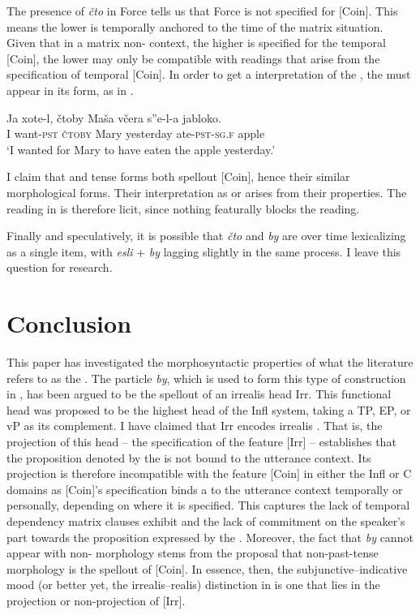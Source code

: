 \documentclass[output=paper,modfonts,newtxmath,hidelinks,]{langscibook}
\begin{document}
\noindent The presence of \textit{čto} in Force tells us that Force is not specified for [Coin]. This means the lower  is temporally anchored to the time of the matrix situation. Given that in a matrix non- context, the higher  is specified for the temporal [Coin], the lower  may only be compatible with readings that arise from the specification of temporal [Coin]. In order to get a  interpretation of the  , the  must appear in its  form, as in .

\ea \label{10:ex34}
\gll Ja xote-l, čtoby Maša včera s”e-l-a jabloko.\\
     I want\textsc{-pst} \textsc{čtoby} Mary yesterday ate\textsc{-pst-sg.f} apple \\
\glt `I wanted for Mary to have eaten the apple yesterday.’
\z

\noindent I claim that   and  tense forms both spellout [Coin], hence their similar morphological forms. Their interpretation as  or  arises from their  properties. The  reading in  is therefore licit, since nothing featurally blocks the reading.

Finally and speculatively, it is possible that \textit{čto} and \textit{by} are over time lexicalizing as a single item, with \textit{esli} + \textit{by} lagging slightly in the same process. I leave this question for  research.

\section{Conclusion}\label{10:s6}

This paper has investigated the morphosyntactic properties of what the literature refers to as the  . The particle \textit{by}, which is used to form this type of construction in , has been argued to be the spellout of an irrealis head Irr. This functional head was proposed to be the highest head of the  Infl system, taking a TP, EP, or vP as its complement. I have claimed that Irr encodes irrealis . That is, the projection of this head -- the specification of the feature [Irr] -- establishes that the proposition denoted by the  is not bound to the utterance context. Its projection is therefore incompatible with the feature [Coin] in either the Infl or C domains as [Coin]’s specification binds a  to the utterance context temporally or personally, depending on where it is specified. This captures the lack of temporal dependency matrix  clauses exhibit and the lack of commitment on the speaker’s part towards the proposition expressed by the  . Moreover, the fact that \textit{by} cannot appear with non- morphology stems from the proposal that non-past-tense morphology is the spellout of [Coin]. In essence, then, the subjunctive--indicative mood (or better yet, the irrealis--realis) distinction in  is one that lies in the projection or non-projection of [Irr].
\end{document}
